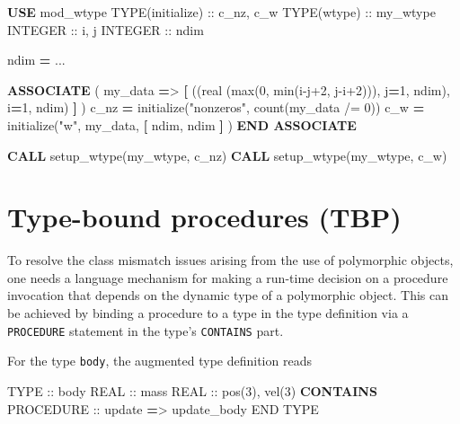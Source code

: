 \documentclass[
]{article}
\newenvironment{Shaded}{}{}
\newcommand{\DataTypeTok}[1]{\textcolor[rgb]{0.56,0.13,0.00}{#1}}
\newcommand{\DecValTok}[1]{\textcolor[rgb]{0.25,0.63,0.44}{#1}}
\newcommand{\FunctionTok}[1]{\textcolor[rgb]{0.02,0.16,0.49}{#1}}
\newcommand{\KeywordTok}[1]{\textcolor[rgb]{0.00,0.44,0.13}{\textbf{#1}}}
\newcommand{\NormalTok}[1]{#1}
\newcommand{\OperatorTok}[1]{\textcolor[rgb]{0.40,0.40,0.40}{#1}}
\newcommand{\StringTok}[1]{\textcolor[rgb]{0.25,0.44,0.63}{#1}}
\begin{document}
\begin{Shaded}
\begin{Highlighting}[]
\KeywordTok{USE}\NormalTok{ mod\_wtype}
\DataTypeTok{TYPE(initialize)} \DataTypeTok{::}\NormalTok{ c\_nz, c\_w}
\DataTypeTok{TYPE(wtype)} \DataTypeTok{::}\NormalTok{ my\_wtype}
\DataTypeTok{INTEGER} \DataTypeTok{::}\NormalTok{ i, j}
\DataTypeTok{INTEGER} \DataTypeTok{::}\NormalTok{ ndim}

\NormalTok{ndim }\KeywordTok{=}\NormalTok{ ...}

\KeywordTok{ASSOCIATE}\NormalTok{ ( my\_data }\KeywordTok{=}\OperatorTok{\textgreater{}} \KeywordTok{[}\NormalTok{ ((}\DataTypeTok{real (max(0, min(i{-}j+2, j{-}i+2)))}\NormalTok{, j}\KeywordTok{=}\DecValTok{1}\NormalTok{, ndim), i}\KeywordTok{=}\DecValTok{1}\NormalTok{, ndim) }\KeywordTok{]}\NormalTok{ )}
\NormalTok{   c\_nz }\KeywordTok{=}\NormalTok{ initialize(}\StringTok{"nonzeros"}\NormalTok{, }\FunctionTok{count}\NormalTok{(my\_data }\OperatorTok{/=} \DecValTok{0}\NormalTok{))}
\NormalTok{   c\_w }\KeywordTok{=}\NormalTok{ initialize(}\StringTok{"w"}\NormalTok{, my\_data, }\KeywordTok{[}\NormalTok{ ndim, ndim }\KeywordTok{]}\NormalTok{ )}
\KeywordTok{END ASSOCIATE}

\KeywordTok{CALL}\NormalTok{ setup\_wtype(my\_wtype, c\_nz)}
\KeywordTok{CALL}\NormalTok{ setup\_wtype(my\_wtype, c\_w)}
\end{Highlighting}
\end{Shaded}

\section{Type-bound procedures (TBP)}\label{sec:tbp}

To resolve the class mismatch issues arising from the use of polymorphic
objects, one needs a language mechanism for making a run-time decision
on a procedure invocation that depends on the dynamic type of a
polymorphic object. This can be achieved by binding a procedure to a
type in the type definition via a \texttt{PROCEDURE} statement in the
type's \texttt{CONTAINS} part.

For the type \texttt{body}, the augmented type definition reads

\begin{Shaded}
\begin{Highlighting}[]
\DataTypeTok{TYPE} \DataTypeTok{::}\NormalTok{ body}
   \DataTypeTok{REAL} \DataTypeTok{::}\NormalTok{ mass}
   \DataTypeTok{REAL} \DataTypeTok{::}\NormalTok{ pos(}\DecValTok{3}\NormalTok{), vel(}\DecValTok{3}\NormalTok{)}
\KeywordTok{CONTAINS}
   \DataTypeTok{PROCEDURE} \DataTypeTok{::}\NormalTok{ update }\KeywordTok{=}\OperatorTok{\textgreater{}}\NormalTok{ update\_body}
\DataTypeTok{END TYPE}
\end{Highlighting}
\end{Shaded}
\end{document}
